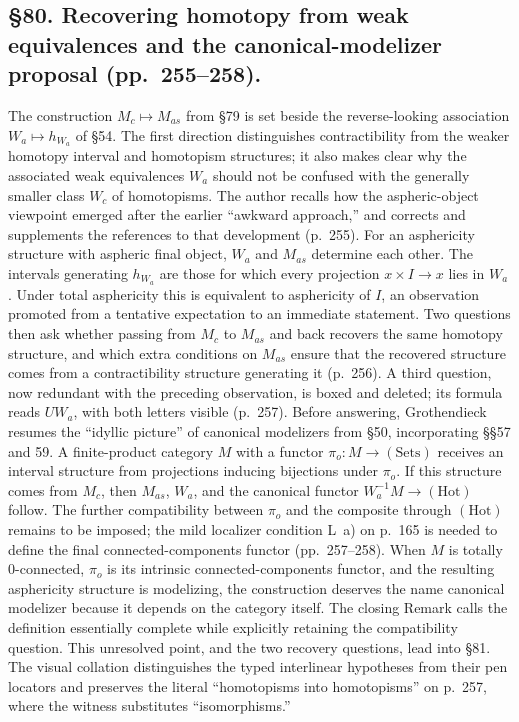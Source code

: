 \documentclass[10pt,oneside]{book}
\begin{document}
\subsection*{\S80. Recovering homotopy from weak equivalences and the canonical-modelizer proposal (pp.\ 255--258).}
The construction $M_c\mapsto M_{as}$ from \S79 is set beside the reverse-looking association $W_a\mapsto h_{W_a}$ of \S54. The first direction distinguishes contractibility from the weaker homotopy interval and homotopism structures; it also makes clear why the associated weak equivalences $W_a$ should not be confused with the generally smaller class $W_c$ of homotopisms. The author recalls how the aspheric-object viewpoint emerged after the earlier “awkward approach,” and corrects and supplements the references to that development (p.\ 255). For an asphericity structure with aspheric final object, $W_a$ and $M_{as}$ determine each other. The intervals generating $h_{W_a}$ are those for which every projection $x\times I\to x$ lies in $W_a$. Under total asphericity this is equivalent to asphericity of $I$, an observation promoted from a tentative expectation to an immediate statement. Two questions then ask whether passing from $M_c$ to $M_{as}$ and back recovers the same homotopy structure, and which extra conditions on $M_{as}$ ensure that the recovered structure comes from a contractibility structure generating it (p.\ 256). A third question, now redundant with the preceding observation, is boxed and deleted; its formula reads $UW_a$, with both letters visible (p.\ 257). Before answering, Grothendieck resumes the “idyllic picture” of canonical modelizers from \S50, incorporating \S\S57 and 59. A finite-product category $M$ with a functor $\pi_o:M\to(\mathrm{Sets})$ receives an interval structure from projections inducing bijections under $\pi_o$. If this structure comes from $M_c$, then $M_{as}$, $W_a$, and the canonical functor $W_a^{-1}M\to(\mathrm{Hot})$ follow. The further compatibility between $\pi_o$ and the composite through $(\mathrm{Hot})$ remains to be imposed; the mild localizer condition L~a) on p.\ 165 is needed to define the final connected-components functor (pp.\ 257--258). When $M$ is totally 0-connected, $\pi_o$ is its intrinsic connected-components functor, and the resulting asphericity structure is modelizing, the construction deserves the name canonical modelizer because it depends on the category itself. The closing Remark calls the definition essentially complete while explicitly retaining the compatibility question. This unresolved point, and the two recovery questions, lead into \S81. The visual collation distinguishes the typed interlinear hypotheses from their pen locators and preserves the literal “homotopisms into homotopisms” on p.\ 257, where the witness substitutes “isomorphisms.”
\end{document}
